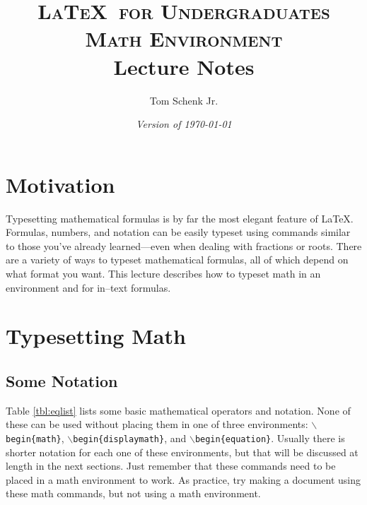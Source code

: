 \documentclass{article}
\title{\textsc{\LaTeX\ for Undergraduates\\
			Math Environment} \\
			Lecture Notes}
\author{Tom Schenk Jr.}		%
\date{\textit{Version of \today}}
\begin{document}
\maketitle

\section{Motivation}

Typesetting mathematical formulas is by far the most elegant feature of \LaTeX. Formulas, numbers, and notation can be easily typeset using commands similar to those you've already learned---even when dealing with fractions or roots. There are a variety of ways to typeset mathematical formulas, all of which depend on what format you want. This lecture describes how to typeset math in an environment and for in--text formulas.

\section{Typesetting Math}

\subsection{Some Notation}

Table \ref{tbl:eqlist} lists some basic mathematical operators and notation. None of these can be used without placing them in one of three environments: \texttt{$\backslash$begin\{math\}}, \texttt{$\backslash$begin\{displaymath\}}, and \texttt{$\backslash$begin\{equation\}}. Usually there is shorter notation for each one of these environments, but that will be discussed at length in the next sections. Just remember that these commands need to be placed in a math environment to work. As practice, try making a document using these math commands, but not using a math environment.
\end{document}
